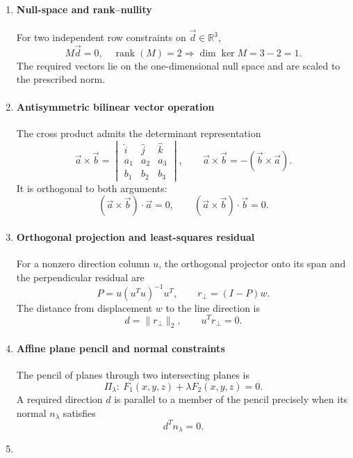 \renewcommand{\theenumi}{\thesubsection.\arabic{enumi}}
\renewcommand{\labelenumi}{\textbf{\theenumi}}
\begin{enumerate}[leftmargin=0pt,itemsep=6pt]
\item
\paragraph*{Null-space and rank--nullity}
For two independent row constraints on $\vec d\in\mathbb R^3$,
\[
M\vec d=0,\quad \operatorname{rank}(M)=2
\Longrightarrow \dim\ker M=3-2=1.
\]
The required vectors lie on the one-dimensional null space and are scaled to the prescribed norm.
\label{eq:nullspace-01}
\addtocounter{enumi}{3}
\item
\paragraph*{Antisymmetric bilinear vector operation}
The cross product admits the determinant representation
\[
\vec a\times\vec b=
\begin{vmatrix}
\hat i&\hat j&\hat k\\
a_1&a_2&a_3\\
b_1&b_2&b_3
\end{vmatrix},
\qquad
\vec a\times\vec b=-(\vec b\times\vec a).
\]
It is orthogonal to both arguments:
\[
(\vec a\times\vec b)\cdot\vec a=0,\qquad
(\vec a\times\vec b)\cdot\vec b=0.
\]
\label{eq:cross-product}
\item
\paragraph*{Orthogonal projection and least-squares residual}
For a nonzero direction column $u$, the orthogonal projector onto its span and the perpendicular residual are
\[
P=u(u^Tu)^{-1}u^T,\qquad r_\perp=(I-P)w.
\]
The distance from displacement $w$ to the line direction is
\[
d=\|r_\perp\|_2,\qquad u^Tr_\perp=0.
\]
\label{eq:parallel-distance}
\addtocounter{enumi}{3}
\item
\paragraph*{Affine plane pencil and normal constraints}
The pencil of planes through two intersecting planes is
\[
\Pi_\lambda:\ F_1(x,y,z)+\lambda F_2(x,y,z)=0.
\]
A required direction $d$ is parallel to a member of the pencil precisely when its normal $n_\lambda$ satisfies
\[
d^Tn_\lambda=0.
\]
\label{eq:line-plane-parallel}
\addtocounter{enumi}{4}
\item

\end{enumerate}
